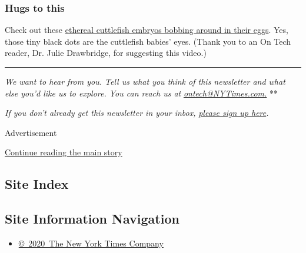 \hypertarget{hugs-to-this}{%
\subsubsection{Hugs to this}\label{hugs-to-this}}

Check out these \href{https://vimeo.com/424875558}{ethereal cuttlefish
embryos bobbing around in their eggs}. Yes, those tiny black dots are
the cuttlefish babies' eyes. (Thank you to an On Tech reader, Dr. Julie
Drawbridge, for suggesting this video.)

\begin{center}\rule{0.5\linewidth}{\linethickness}\end{center}

\emph{We want to hear from you. Tell us what you think of this
newsletter and what else you'd like us to explore. You can reach us at}
\href{mailto:ontech@NYTimes.com?subject=On\%20Tech\%20Feedback}{\emph{ontech@NYTimes.com.}}
**

\emph{If you don't already get this newsletter in your inbox,}
\href{https://www.nytimes3xbfgragh.onion/newsletters/signup/OT}{\emph{please
sign up here}}\emph{.}

Advertisement

\protect\hyperlink{after-bottom}{Continue reading the main story}

\hypertarget{site-index}{%
\subsection{Site Index}\label{site-index}}

\hypertarget{site-information-navigation}{%
\subsection{Site Information
Navigation}\label{site-information-navigation}}

\begin{itemize}
\tightlist
\item
  \href{https://help.nytimes3xbfgragh.onion/hc/en-us/articles/115014792127-Copyright-notice}{©~2020~The
  New York Times Company}
\end{itemize}

